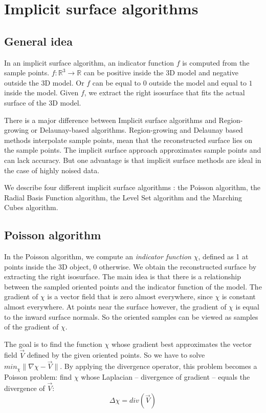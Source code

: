 \documentclass[a4paper]{article}
\begin{document}
\section{Implicit surface algorithms}
\subsection{General idea}
In an implicit surface algorithm, an indicator function $f$ is computed from the sample points. $f:\mathbb{R}^3 \to \mathbb{R}$ can be positive inside the 3D model and negative outside the 3D model. Or $f$ can be equal to $0$ outside the model and equal to $1$ inside the model. Given $f$, we extract the right isosurface that fits the actual surface of the 3D model.

There is a major difference between Implicit surface algorithms and Region-growing or Delaunay-based algorithms. Region-growing and Delaunay based methods interpolate sample points, mean that the reconstructed surface lies on the sample points. The implicit surface approach approximates sample points and can lack accuracy. But one advantage is that implicit surface methods are ideal in the case of highly noised data.

We describe four different implicit surface algorithms : the Poisson algorithm, the Radial Basis Function algorithm, the Level Set algorithm and the Marching Cubes algorithm.


\subsection{Poisson algorithm}
In the Poisson algorithm, we compute an \emph{indicator function} $\chi$, defined as 1 at points inside the 3D object, 0 otherwise. We obtain the reconstructed surface by extracting the right isosurface. The main idea is that there is a relationship between the sampled oriented points and the indicator function of the model. The gradient of $\chi$ is  a vector field that is zero almost everywhere, since $\chi$ is constant almost everywhere. At points near the surface however, the gradient of $\chi$ is equal to the inward surface normals. So the oriented samples can be viewed as samples of the gradient of $\chi$.

The goal is to find the function $\chi$ whose gradient best approximates the vector field $\vec{V}$ defined by the given oriented points. So we have to solve $min_\chi\|\nabla\chi - \vec{V}\|$. By applying the divergence operator, this problem becomes a Poisson problem: find $\chi$ whose Laplacian -- divergence of gradient -- equals the divergence of $\vec{V}$:
$$\Delta\chi = div(\vec{V})$$
\end{document}
